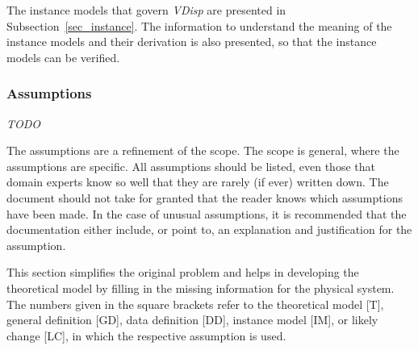 \documentclass[12pt]{article}
\begin{document}
\begin{figure}[H]
\end{figure}

The instance models that govern \emph{VDisp}{} are presented in
Subsection~\ref{sec_instance}.  The information to understand the meaning of the
instance models and their derivation is also presented, so that the instance
models can be verified.

\subsubsection{Assumptions} \label{sec_assumpt}

\emph{TODO}

The assumptions are a refinement of the scope.  The scope is general, where the
assumptions are specific.  All assumptions should be listed, even those that
domain experts know so well that they are rarely (if ever) written down. The
document should not take for granted that the reader knows which assumptions
have been made. In the case of unusual assumptions, it is recommended that the
documentation either include, or point to, an explanation and justification for
the assumption.

This section simplifies the original problem and helps in developing the
theoretical model by filling in the missing information for the physical
system. The numbers given in the square brackets refer to the theoretical model
[T], general definition [GD], data definition [DD], instance model [IM], or
likely change [LC], in which the respective assumption is used.
\end{document}
